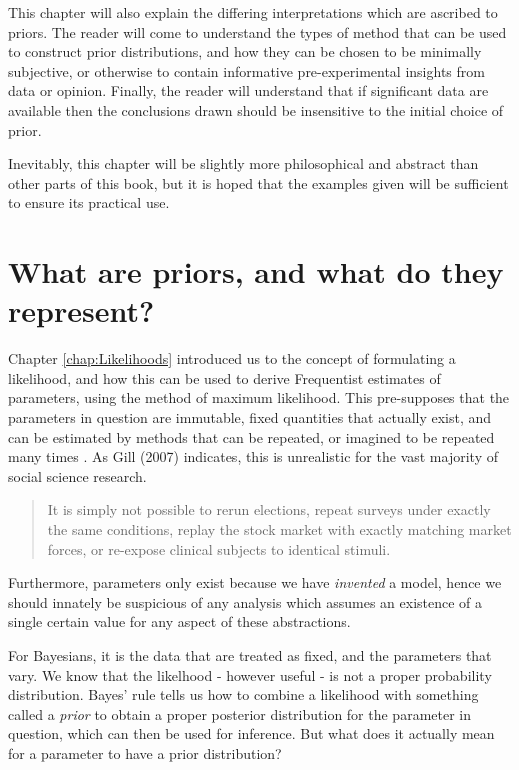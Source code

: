 \documentclass[11pt,fullpage]{book}
\begin{document}
This chapter will also explain the differing interpretations which are ascribed to priors. The reader will come to understand the types of method that can be used to construct prior distributions, and how they can be chosen to be minimally subjective, or otherwise to contain informative pre-experimental insights from data or opinion. Finally, the reader will understand that if significant data are available then the conclusions drawn should be insensitive to the initial choice of prior.

Inevitably, this chapter will be slightly more philosophical and abstract than other parts of this book, but it is hoped that the examples given will be sufficient to ensure its practical use.

\section{What are priors, and what do they represent?}
Chapter \ref{chap:Likelihoods} introduced us to the concept of formulating a likelihood, and how this can be used to derive Frequentist estimates of parameters, using the method of maximum likelihood. This pre-supposes that the parameters in question are immutable, fixed quantities that actually exist, and can be estimated by methods that can be repeated, or imagined to be repeated many times \cite{gill2007bayesian}. As Gill (2007) indicates, this is unrealistic for the vast majority of social science research.

\begin{quotation}
It is simply not possible to rerun elections, repeat surveys under exactly the same conditions, replay the stock market with exactly matching market forces, or re-expose clinical subjects to identical stimuli.
\end{quotation}

Furthermore, parameters only exist because we have \textit{invented} a model, hence we should innately be suspicious of any analysis which assumes an existence of a single certain value for any aspect of these abstractions.

For Bayesians, it is the data that are treated as fixed, and the parameters that vary. We know that the likelhood - however useful - is not a proper probability distribution. Bayes' rule tells us how to combine a likelihood with something called a \textit{prior} to obtain a proper posterior distribution for the parameter in question, which can then be used for inference. But what does it actually mean for a parameter to have a prior distribution?
\end{document}
